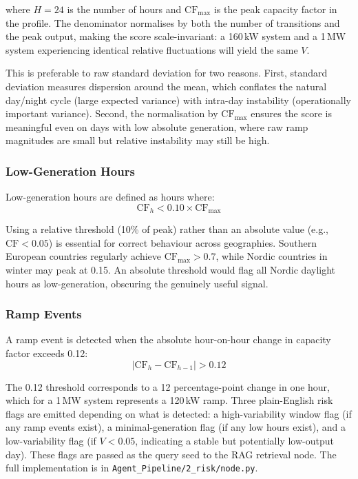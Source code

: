 \documentclass[12pt, a4paper]{article}
\begin{document}
where $H = 24$ is the number of hours and $\text{CF}_{\max}$ is the peak capacity factor in the profile. The denominator normalises by both the number of transitions and the peak output, making the score scale-invariant: a 160\,kW system and a 1\,MW system experiencing identical relative fluctuations will yield the same $V$.

This is preferable to raw standard deviation for two reasons. First, standard deviation measures dispersion around the mean, which conflates the natural day/night cycle (large expected variance) with intra-day instability (operationally important variance). Second, the normalisation by $\text{CF}_{\max}$ ensures the score is meaningful even on days with low absolute generation, where raw ramp magnitudes are small but relative instability may still be high.

\subsubsection{Low-Generation Hours}

Low-generation hours are defined as hours where:
\begin{equation}
    \text{CF}_h < 0.10 \times \text{CF}_{\max}
\end{equation}

Using a relative threshold (10\% of peak) rather than an absolute value (e.g., $\text{CF} < 0.05$) is essential for correct behaviour across geographies. Southern European countries regularly achieve $\text{CF}_{\max} > 0.7$, while Nordic countries in winter may peak at 0.15. An absolute threshold would flag all Nordic daylight hours as low-generation, obscuring the genuinely useful signal.

\subsubsection{Ramp Events}

A ramp event is detected when the absolute hour-on-hour change in capacity factor exceeds 0.12:
\begin{equation}
    |\text{CF}_h - \text{CF}_{h-1}| > 0.12
\end{equation}

The 0.12 threshold corresponds to a 12 percentage-point change in one hour, which for a 1\,MW system represents a 120\,kW ramp. Three plain-English risk flags are emitted depending on what is detected: a high-variability window flag (if any ramp events exist), a minimal-generation flag (if any low hours exist), and a low-variability flag (if $V < 0.05$, indicating a stable but potentially low-output day). These flags are passed as the query seed to the RAG retrieval node. The full implementation is in \texttt{Agent\_Pipeline/2\_risk/node.py}.
\end{document}
